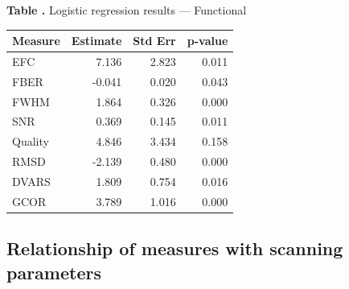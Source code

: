 \begin{table}
  \textbf{\label{tab_log_reg_func} Table .}{ Logistic regression results --- Functional }
  \begin{center}
    \begin{tabular}{ l r r r }
    \hline
    Measure &Estimate & Std Err & p-value  \\ \hline
    EFC	    &	7.136	&	2.823	&	0.011	\\
    FBER	&	-0.041  &	0.020	&	0.043	\\
    FWHM	&	1.864	&	0.326	&	0.000	\\
    SNR	    &	0.369	&	0.145	&	0.011	\\
    Quality	&	4.846	&	3.434	&	0.158	\\
    RMSD	&	-2.139  &	0.480	&	0.000	\\
    DVARS	&	1.809	&	0.754	&	0.016	   \\
    GCOR	&	3.789	&	1.016	&	0.000	\\
    \hline
    \end{tabular}
  \end{center}
\end{table}


\subsection{Relationship of measures with scanning parameters}

